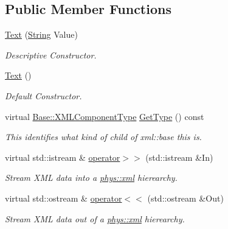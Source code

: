 \subsection*{Public Member Functions}
\begin{DoxyCompactItemize}
\item 
\hyperlink{classphys_1_1xml_1_1Text_a553a3bc10d4865f48e5d11e0b2e1e773}{Text} (\hyperlink{namespacephys_aa03900411993de7fbfec4789bc1d392e}{String} Value)
\begin{DoxyCompactList}\small\item\em Descriptive Constructor. \item\end{DoxyCompactList}\item 
\hypertarget{classphys_1_1xml_1_1Text_a7205430aaf4d1873f267b43042900f2f}{
\hyperlink{classphys_1_1xml_1_1Text_a7205430aaf4d1873f267b43042900f2f}{Text} ()}
\label{d3/da7/classphys_1_1xml_1_1Text_a7205430aaf4d1873f267b43042900f2f}

\begin{DoxyCompactList}\small\item\em Default Constructor. \item\end{DoxyCompactList}\item 
virtual \hyperlink{classphys_1_1xml_1_1Base_a62ba0484b5ecb502f9ae9d82d3720320}{Base::XMLComponentType} \hyperlink{classphys_1_1xml_1_1Text_a51b896f07b2dae7d5ee05f9e2515ee97}{GetType} () const 
\begin{DoxyCompactList}\small\item\em This identifies what kind of child of xml::base this is. \item\end{DoxyCompactList}\item 
virtual std::istream \& \hyperlink{classphys_1_1xml_1_1Text_a7b4f11184258ddaacd3682354800b306}{operator$>$$>$} (std::istream \&In)
\begin{DoxyCompactList}\small\item\em Stream XML data into a \hyperlink{namespacephys_1_1xml}{phys::xml} hierearchy. \item\end{DoxyCompactList}\item 
virtual std::ostream \& \hyperlink{classphys_1_1xml_1_1Text_a6fbf51e2b04600f0722f0418c9669a58}{operator$<$$<$} (std::ostream \&Out)
\begin{DoxyCompactList}\small\item\em Stream XML data out of a \hyperlink{namespacephys_1_1xml}{phys::xml} hierearchy. \item\end{DoxyCompactList}\end{DoxyCompactItemize}
